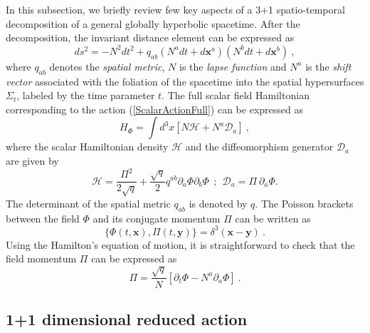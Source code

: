 \documentclass[aps,12pt,showpacs]{revtex4-2}
\def\x{\mathbf{x}}
\def\y{\mathbf{y}}
\begin{document}
In this subsection, we briefly review few key aspects of a 3+1 
spatio-temporal decomposition \cite{book:3plus1} of a general globally 
hyperbolic spacetime. After the decomposition, the invariant distance element 
can be expressed as
%
\begin{equation}\label{GeneralMetricIn31}
ds^2 = -N^2 dt^2 + q_{ab}(N^a dt+d\x^{a})(N^b dt + d\x^{b}) ~,
\end{equation}
% 
where $q_{ab}$ denotes the \emph{spatial metric}, $N$ is the \emph{lapse 
function} and $N^a$ is the \emph{shift vector} associated with the foliation of 
the spacetime into the spatial hypersurfaces $\Sigma_t$, labeled by the 
time parameter $t$.
%
The full scalar field Hamiltonian corresponding to the action 
(\ref{ScalarActionFull}) can be expressed as
%
\begin{equation}\label{GeneralScalarFieldHamiltonianFull}
H_{\Phi} = \int d^{3}x \left[ N \mathcal{H} + N^a \mathcal{D}_a \right] ~,
\end{equation}
%
where the scalar Hamiltonian density $\mathcal{H}$ and the diffeomorphism 
generator $\mathcal{D}_a$ are given by
%
\begin{equation}\label{ScalarHamiltonianAndDiffeomorphismFull}
\mathcal{H} = \frac{\Pi^2}{2\sqrt{q}} + 
\frac{\sqrt{q}}{2} q^{ab} \partial_{a}\Phi \partial_{b}\Phi  
~~;~~  
\mathcal{D}_a = \Pi~ \partial_a \Phi
.
\end{equation}
%
The determinant of the spatial metric $q_{ab}$ is denoted by $q$. The Poisson 
brackets between the field $\Phi$ and its conjugate   momentum $\Pi$ can be 
written as
%
\begin{equation}\label{PoissonBracketFull}
\{\Phi(t,\x), \Pi(t,\y)\} = \delta^3(\x-\y) ~.
\end{equation}
%
Using the Hamilton's equation of motion, it is straightforward to check that 
the field momentum $\Pi$ can be expressed as 
%
\begin{equation}\label{FieldMomentumGeneral}
\Pi = \frac{\sqrt{q}}{N} 
\left[\partial_{t}\Phi - N^a \partial_{a}\Phi \right] ~.
\end{equation}
%



\subsection{1+1 dimensional reduced action}
\end{document}
